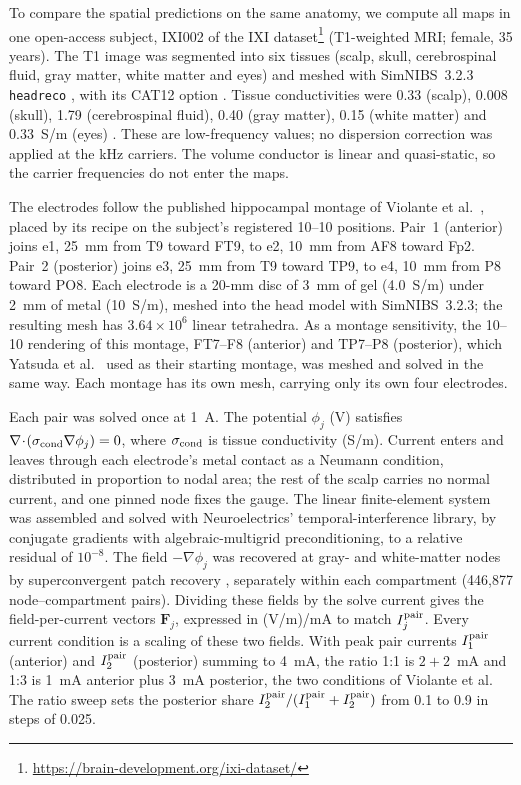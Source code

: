 \documentclass[11pt,a4paper]{article}
\providecommand{\DIFaddtex}[1]{{\protect\color{blue} \sf #1}} %
\providecommand{\DIFaddend}{} %
\providecommand{\DIFadd}[1]{\texorpdfstring{\DIFaddtex{#1}}{#1}} %
\begin{document}
\else
\label{supp:fem-protocol}
\DIFadd{To compare the spatial predictions on the same anatomy, we compute all maps
in }\DIFaddend one open-access subject,
IXI002 of the IXI dataset\footnote{\url{https://brain-development.org/ixi-dataset/}}
(T1-weighted MRI; female, 35 years). The T1 image was segmented into six tissues
(scalp, skull, cerebrospinal fluid, gray matter, white matter and eyes) and meshed with
SimNIBS~3.2.3 \texttt{headreco} \cite{nielsen2018}, with its CAT12 option
\cite{gaser2024}. Tissue conductivities were 0.33 (scalp), 0.008 (skull), 1.79
(cerebrospinal fluid), 0.40 (gray matter), 0.15 (white matter) and 0.33~S/m (eyes)
\cite{salvador2025}. These are low-frequency values; no dispersion correction was
applied at the kHz carriers. The volume conductor is linear and quasi-static, so the
carrier frequencies do not enter the maps.

The electrodes follow the published hippocampal montage of Violante et al.\
\cite{violante2023}, placed by its recipe on the subject's registered 10--10
positions. Pair~1 (anterior) joins e1, 25~mm from T9 toward FT9, to e2, 10~mm from AF8
toward Fp2. Pair~2 (posterior) joins e3, 25~mm from T9 toward TP9, to e4, 10~mm from P8
toward PO8. Each electrode is a 20-mm disc of 3~mm of gel (4.0~S/m) under 2~mm of metal
(10~S/m), meshed into the head model with SimNIBS~3.2.3; the resulting mesh has
$3.64\times10^6$ linear tetrahedra. As a montage sensitivity, the 10--10 rendering of
this montage, FT7--F8 (anterior) and TP7--P8 (posterior), which Yatsuda et al.\
\cite{yatsuda2024} used as their starting montage, was meshed and solved in the same
way. Each montage has its own mesh, carrying only its own four electrodes.

Each pair was solved once at 1~A. The potential $\phi_j$ (V) satisfies
$\nabla\!\cdot\!(\sigma_{\rm cond}\nabla\phi_j)=0$, where
$\sigma_{\rm cond}$ is tissue conductivity (S/m). Current enters and leaves through each
electrode's metal contact as a Neumann condition, distributed in proportion to nodal
area; the rest of the scalp carries no normal current, and one pinned node fixes the
gauge. The linear finite-element system was assembled and solved with Neuroelectrics'
temporal-interference library, by conjugate gradients with algebraic-multigrid
preconditioning, to a relative residual of $10^{-8}$. The field
$-\nabla\phi_j$ was recovered at gray- and white-matter
nodes by superconvergent patch recovery \cite{zienkiewicz1992}, separately within each
compartment (446{,}877 node--compartment pairs). Dividing these fields by the solve
current gives the field-per-current vectors $\mathbf F_j$, expressed in
(V/m)/mA to match $I_j^{\rm pair}$. Every current condition is a scaling of these two fields.
With peak pair currents $I_1^{\rm pair}$ (anterior) and
$I_2^{\rm pair}$ (posterior) summing to 4~mA, the ratio 1:1 is $2+2$~mA and 1:3 is
1~mA anterior plus 3~mA posterior, the two conditions of Violante et al. The ratio sweep
sets the posterior share $I_2^{\rm pair}/(I_1^{\rm pair}+I_2^{\rm pair})$ from 0.1 to
0.9 in steps of 0.025.
\end{document}
